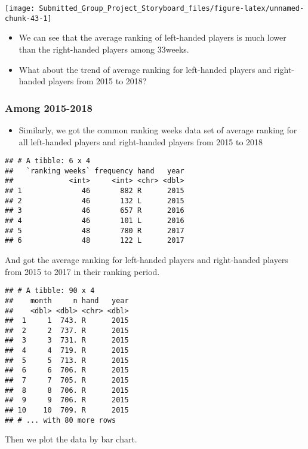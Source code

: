 \documentclass[]{article}
\providecommand{\tightlist}{%
  \setlength{\itemsep}{0pt}\setlength{\parskip}{0pt}}
\begin{document}
\begin{center}\texttt{[image: Submitted\_Group\_Project\_Storyboard\_files/figure-latex/unnamed-chunk-43-1]} \end{center}

\begin{itemize}
\tightlist
\item
  We can see that the average ranking of left-handed players is much
  lower than the right-handed players among 33weeks.
\item
  What about the trend of average ranking for left-handed players and
  right-handed players from 2015 to 2018?
\end{itemize}

\subsubsection{Among 2015-2018}\label{among-2015-2018}

\begin{itemize}
\tightlist
\item
  Similarly, we got the common ranking weeks data set of average ranking
  for all left-handed players and right-handed players from 2015 to 2018
\end{itemize}

\begin{verbatim}
## # A tibble: 6 x 4
##   `ranking weeks` frequency hand   year
##             <int>     <int> <chr> <dbl>
## 1              46       882 R      2015
## 2              46       132 L      2015
## 3              46       657 R      2016
## 4              46       101 L      2016
## 5              48       780 R      2017
## 6              48       122 L      2017
\end{verbatim}

And got the average ranking for left-handed players and right-handed
players from 2015 to 2017 in their ranking period.

\begin{verbatim}
## # A tibble: 90 x 4
##    month     n hand   year
##    <dbl> <dbl> <chr> <dbl>
##  1     1  743. R      2015
##  2     2  737. R      2015
##  3     3  731. R      2015
##  4     4  719. R      2015
##  5     5  713. R      2015
##  6     6  706. R      2015
##  7     7  705. R      2015
##  8     8  706. R      2015
##  9     9  706. R      2015
## 10    10  709. R      2015
## # ... with 80 more rows
\end{verbatim}

Then we plot the data by bar chart.
\end{document}
